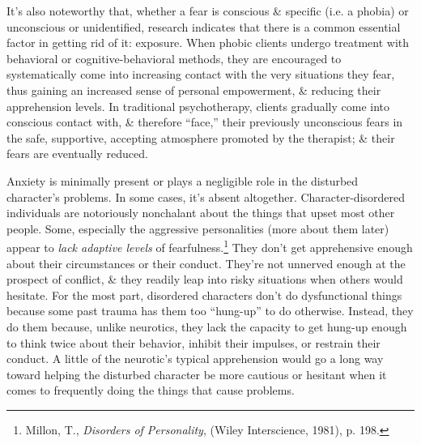 \documentclass{article}
\numberwithin{equation}{section}
\begin{document}
It's also noteworthy that, whether a fear is conscious \& specific (i.e. a phobia) or unconscious or unidentified, research indicates that there is a common essential factor in getting rid of it: exposure. When phobic clients undergo treatment with behavioral or cognitive-behavioral methods, they are encouraged to systematically come into increasing contact with the very situations they fear, thus gaining an increased sense of personal empowerment, \& reducing their apprehension levels. In traditional psychotherapy, clients gradually come into conscious contact with, \& therefore ``face,'' their previously unconscious fears in the safe, supportive, accepting atmosphere promoted by the therapist; \& their fears are eventually reduced.

Anxiety is minimally present or plays a negligible role in the disturbed character's problems. In some cases, it's absent altogether. Character-disordered individuals are notoriously nonchalant about the things that upset most other people. Some, especially the aggressive personalities (more about them later) appear to \textit{lack adaptive levels} of fearfulness.\footnote{Millon, T., \textit{Disorders of Personality}, (Wiley Interscience, 1981), p. 198.} They don't get apprehensive enough about their circumstances or their conduct. They're not unnerved enough at the prospect of conflict, \& they readily leap into risky situations when others would hesitate. For the most part, disordered characters don't do dysfunctional things because some past trauma has them too ``hung-up'' to do otherwise. Instead, they do them because, unlike neurotics, they lack the capacity to get hung-up enough to think twice about their behavior, inhibit their impulses, or restrain their conduct. A little of the neurotic's typical apprehension would go a long way toward helping the disturbed character be more cautious or hesitant when it comes to frequently doing the  things that cause problems.
\end{document}

